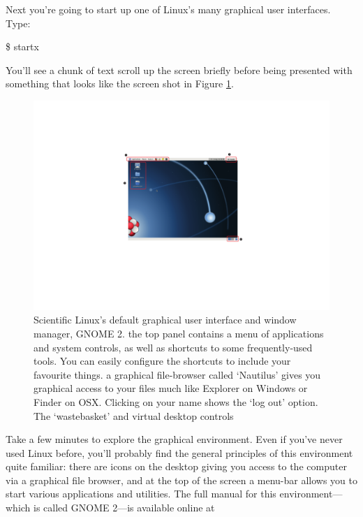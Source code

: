 Next you're going to start up one of Linux's many graphical user interfaces. Type:

\begin{ttoutenv}
\$ startx
\end{ttoutenv}


You'll see a chunk of text scroll up the screen briefly before being presented with something that looks like the screen shot in Figure \ref{figure:gnome-desktop}.

\begin{figure}[t]
\centerline{\includegraphics[width=16cm]{images/gnome-desktop}}
\caption{Scientific Linux's default graphical user interface and
  window manager, GNOME 2. \protect{} the top panel contains
  a menu of applications and system controls, as well as shortcuts to
  some frequently-used tools. You can easily configure the shortcuts
  to include your favourite things. \protect{} a graphical
  file-browser called `Nautilus' gives you graphical access to your
  files much like Explorer on Windows or Finder on
  OSX. \protect{} Clicking on your name shows the `log out'
  option. \protect{} The `wastebasket' and virtual desktop
  controls}\label{figure:gnome-desktop}
\end{figure}

Take a few minutes to explore the graphical environment. Even if you've never used Linux before, you'll probably find the general principles of this environment quite familiar: there are icons on the desktop giving you access to the computer via a graphical file browser, and at the top of the screen a menu-bar allows you to start various applications and utilities. The full manual for this environment---which is called GNOME 2---is available online at 

